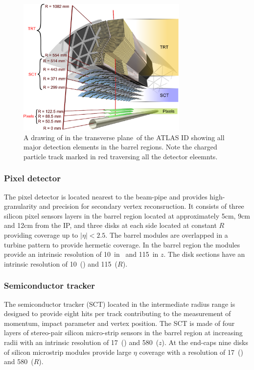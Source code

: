 \begin{figure}[htbp]
  \centering
  \includegraphics[width=0.75\textwidth]{PartDetector/Diagrams/ID_3D_Overview.eps}
  \caption{A drawing of in the transverse plane of the ATLAS ID showing all major detection elements in the barrel regions. Note the charged particle track marked in red traversing all the detector eleemnts.}
  \label{fig:DetectorIDTransverse}
\end{figure}

\subsubsection{Pixel detector}
The pixel detector is located nearest to the beam-pipe and provides high-granularity and precision for secondary vertex reconsruction. It consists of three silicon pixel sensors layers in the barrel region located at approximately 5cm, 9cm and 12cm from the IP, and three disks at each side located at constant $R$ providing coverage up to $|\eta|<2.5$. The barrel modules are overlapped in a turbine pattern to provide hermetic coverage. In the barrel region the modules provide an intrinsic resolution of 10\microm\ in \rphi\ and 115\microm\ in $z$. The disk sections have an intrinsic resolution of 10\microm\ (\rphi) and 115\microm\ ($R$).

\subsubsection{Semiconductor tracker}
The semiconductor tracker (SCT) located in the intermediate radius range is designed to provide eight hits per track contributing to the measurement of momentum, impact parameter and vertex position. The SCT is made of four layers of stereo-pair silicon micro-strip sensors in the barrel region at increasing radii with an intrinsic resolution of 17\microm\ (\rphi) and 580\microm\ ($z$). At the end-caps nine disks of silicon microstrip modules provide large $\eta$ coverage with a resolution of 17\microm\ (\rphi) and 580\microm\ ($R$).

